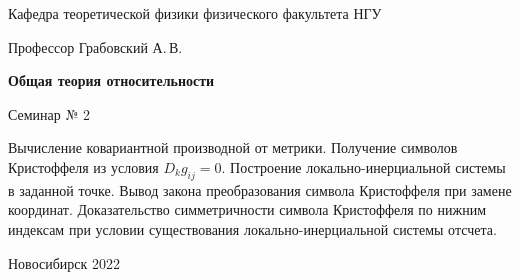 \documentclass[12pt,pagesize,paper=192mm:108mm,landscape]{scrbook}
\begin{document}
\begin{titlepage}
\begin{center}
    Кафедра теоретической физики физического факультета НГУ
    \medskip

    \Large
    Профессор Грабовский А.\,В.
    \smallskip

    \huge
    \textbf{Общая теория относительности}
    \smallskip

    \Large
    Семинар № 2
    \vfill

    \normalsize
    \begin{minipage}{0.85\linewidth}
      Вычисление ковариантной производной от метрики. Получение
      символов Кристоффеля из условия $D_kg_{ij}=0$. Построение
      локально-инерциальной системы в заданной точке. Вывод закона
      преобразования символа Кристоффеля при замене
      координат. Доказательство симметричности символа Кристоффеля по
      нижним индексам при условии существования локально-инерциальной
      системы отсчета.
    \end{minipage}
    \vfill

    \normalsize \ccbysa\hspace{0.5em}  Новосибирск 2022
  \end{center}
\end{titlepage}
\end{document}
